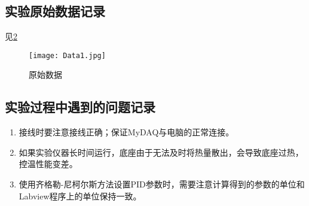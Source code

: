 \documentclass[dvipsnames, svgnames,a4paper,11pt]{article}
\begin{document}



        \begin{figure}[htbp]
            \centering
            \quad
            \quad
    
            \label{fig:data}
        \end{figure}


\clearpage

\subsection{实验原始数据记录}

	见\cref{fig:data}

	\begin{figure}[htbp]
		\centering
		{\texttt{[image: Data1.jpg]}\label{fig:data1}}
		\quad

		\caption{原始数据}
		\label{fig:data}
	\end{figure}




\subsection{实验过程中遇到的问题记录}


\begin{enumerate}
    \item 接线时要注意接线正确；保证MyDAQ与电脑的正常连接。
	\item 如果实验仪器长时间运行，底座由于无法及时将热量散出，会导致底座过热，控温性能变差。
	\item 使用齐格勒-尼柯尔斯方法设置PID参数时，需要注意计算得到的参数的单位和Labview程序上的单位保持一致。
\end{enumerate}
	
\end{document}
